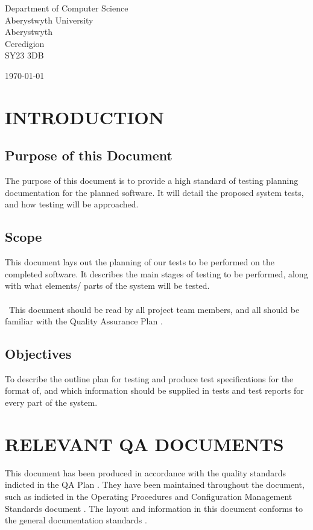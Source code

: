 \documentclass[a4paper]{article}
\begin{document}
\begin{center}
\begin{minipage}{0.8\textwidth}
\begin{flushleft} \large
Department of Computer Science\\
Aberystwyth University\\
Aberystwyth\\
Ceredigion\\
SY23 3DB\\
\end{flushleft}
\end{minipage}
\vfill
{\large \today}
\end{center}
\clearpage
\setlength\parindent{0pt}


\tableofcontents
\clearpage


\section{INTRODUCTION}
\subsection{Purpose of this Document}
The purpose of this document is to provide a high standard of testing planning documentation for the planned software. It will detail the proposed system tests, and how testing will be approached.
\subsection{Scope}
This document lays out the planning of our tests to be performed on the completed software. It describes the main stages of testing to be performed, along with what elements/ parts of the system will be tested. 
\\\\\
This document should be read by all project team members, and all should be familiar with the Quality Assurance Plan \cite{Software Engineering Group Projects. QA Plan.}.
\subsection{Objectives}
To describe the outline plan for testing and produce test specifications for the format of, and which information should be supplied in tests and test reports for every part of the system.
\clearpage


\section{RELEVANT QA  DOCUMENTS}
This document has been produced in accordance with the quality standards indicted in the QA Plan  \cite{Software Engineering Group Projects. QA Plan.}. They have been maintained throughout the document, such as indicted in the Operating Procedures and Configuration Management Standards document \cite{Software Engineering Group Projects. Operating Procedures and Configuration Management Standards.}. The layout and information in this document conforms to the general documentation standards \cite{Software Engineering Group Projects. General Documentation Standards.}.
\end{document}
